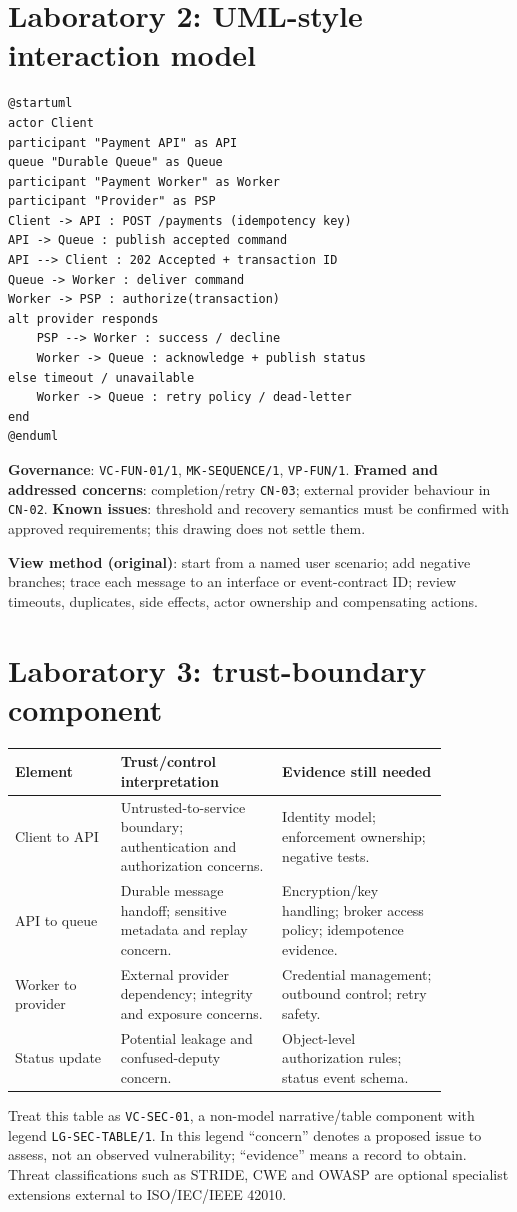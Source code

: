 \documentclass[11pt,letterpaper]{article}
\begin{document}
\section{Laboratory 2: UML-style interaction model}
\begin{lstlisting}[caption={Example only: examples/02-payment-sequence.puml}]
@startuml
actor Client
participant "Payment API" as API
queue "Durable Queue" as Queue
participant "Payment Worker" as Worker
participant "Provider" as PSP
Client -> API : POST /payments (idempotency key)
API -> Queue : publish accepted command
API --> Client : 202 Accepted + transaction ID
Queue -> Worker : deliver command
Worker -> PSP : authorize(transaction)
alt provider responds
    PSP --> Worker : success / decline
    Worker -> Queue : acknowledge + publish status
else timeout / unavailable
    Worker -> Queue : retry policy / dead-letter
end
@enduml
\end{lstlisting}
\textbf{Governance}: \texttt{VC-FUN-01/1}, \texttt{MK-SEQUENCE/1}, \texttt{VP-FUN/1}. \textbf{Framed and addressed concerns}: completion/retry \texttt{CN-03}; external provider behaviour in \texttt{CN-02}. \textbf{Known issues}: threshold and recovery semantics must be confirmed with approved requirements; this drawing does not settle them.\par
\textbf{View method (original)}: start from a named user scenario; add negative branches; trace each message to an interface or event-contract ID; review timeouts, duplicates, side effects, actor ownership and compensating actions.\par
\section{Laboratory 3: trust-boundary component}
\begin{longtable}{p{0.21\linewidth}p{0.32\linewidth}p{0.33\linewidth}}\toprule\textbf{Element}&\textbf{Trust/control interpretation}&\textbf{Evidence still needed}\\\midrule\endhead
Client to API&Untrusted-to-service boundary; authentication and authorization concerns.&Identity model; enforcement ownership; negative tests.\\
API to queue&Durable message handoff; sensitive metadata and replay concern.&Encryption/key handling; broker access policy; idempotence evidence.\\
Worker to provider&External provider dependency; integrity and exposure concerns.&Credential management; outbound control; retry safety.\\
Status update&Potential leakage and confused-deputy concern.&Object-level authorization rules; status event schema.\\\bottomrule\end{longtable}
\begin{Guidance}Treat this table as \texttt{VC-SEC-01}, a non-model narrative/table component with legend \texttt{LG-SEC-TABLE/1}. In this legend ``concern'' denotes a proposed issue to assess, not an observed vulnerability; ``evidence'' means a record to obtain. Threat classifications such as STRIDE, CWE and OWASP are optional specialist extensions external to ISO/IEC/IEEE 42010.\end{Guidance}
\end{document}
